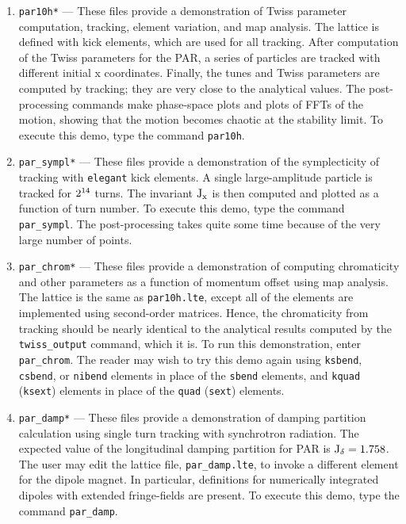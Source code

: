 \documentclass[11pt]{article}
\begin{document}
\begin{enumerate}

\item \verb|par10h*| --- These files provide a demonstration of Twiss
parameter computation, tracking, element variation, and map analysis.
The lattice is defined with kick elements, which are used for all
tracking.  After computation of the Twiss parameters for the
PAR\cite{Borland_PC}, a series of particles are tracked with different
initial x coordinates.  Finally, the tunes and Twiss parameters are
computed by tracking; they are very close to the analytical values.
The post-processing commands make phase-space plots and plots of FFTs
of the motion, showing that the motion becomes chaotic at the
stability limit.  To execute this demo, type the command
\verb|par10h|.

\item \verb|par_sympl*| --- These files provide a demonstration of the
symplecticity of tracking with {\tt elegant} kick elements.  A single
large-amplitude particle is tracked for ${\rm 2^{14}}$ turns.  The
invariant ${\rm J_x}$ is then computed and plotted as a function of
turn number.  To execute this demo, type the command \verb|par_sympl|.
The post-processing takes quite some time because of the very large
number of points.

\item \verb|par_chrom*| --- These files provide a demonstration of
computing chromaticity and other parameters as a function of momentum
offset using map analysis.  The lattice is the same as
\verb|par10h.lte|, except all of the elements are implemented using
second-order matrices.  Hence, the chromaticity from tracking should
be nearly identical to the analytical results computed by the
\verb|twiss_output| command, which it is.  To run this demonstration,
enter \verb|par_chrom|.  The reader may wish to try this demo again
using \verb|ksbend|, \verb|csbend|, or \verb|nibend| elements in place
of the \verb|sbend| elements, and \verb|kquad| (\verb|ksext|) elements
in place of the \verb|quad| (\verb|sext|) elements.

\item \verb|par_damp*| --- These files provide a demonstration of
damping partition calculation using single turn tracking with
synchrotron radiation.  The expected value of the longitudinal damping
partition for PAR is ${\rm J_\delta = 1.758}$.  The user may edit the
lattice file, \verb|par_damp.lte|, to invoke a different element for
the dipole magnet.  In particular, definitions for numerically
integrated dipoles with extended fringe-fields are present.  To
execute this demo, type the command \verb|par_damp|.


\end{enumerate}
\end{document}
